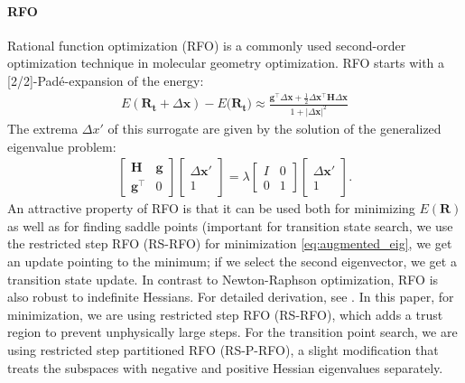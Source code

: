 \documentclass[pdflatex,sn-mathphys-num]{sn-jnl}%
\theoremstyle{thmstyleone}%
\theoremstyle{thmstyletwo}%
\theoremstyle{thmstylethree}%
\begin{document}
\begin{appendices}
\paragraph{RFO \label{sec:rfo_background}}
Rational function optimization (RFO) \citep{simons1983,banerjee1985} is a commonly used second-order optimization technique in molecular geometry optimization. RFO starts with a [2/2]-Pad\'e-expansion of the energy:
\begin{align}
    E(\mathbf{R_t} + \Delta \mathbf{x}) - E(\mathbf{R_t)} \approx \frac{\mathbf{g}^\top \Delta \mathbf{x} + \frac{1}{2} \Delta \mathbf{x}^\top \mathbf{H} \Delta \mathbf{x}}{1 + |\Delta\mathbf{x}|^2 }
\end{align}
The extrema $\Delta x'$ of this surrogate are given by the solution of the generalized eigenvalue problem:
\begin{align}
\begin{bmatrix}
    \mathbf{H} & \mathbf{g} \\
    \mathbf{g}^\top & 0
\end{bmatrix}
\begin{bmatrix}
    \Delta \mathbf{x}' \\
    1
\end{bmatrix}
=
\lambda
\begin{bmatrix}
    I & 0 \\
    0 & 1
\end{bmatrix}
\begin{bmatrix}
    \Delta \mathbf{x}' \\
    1
\end{bmatrix}. \label{eq:augmented_eig}
\end{align}
An attractive property of RFO is that it can be used both for minimizing $E(\mathbf{R})$ as well as for finding saddle points (important for transition state search, we use the restricted step RFO (RS-RFO) for minimization \ref{eq:augmented_eig}, we get an update pointing to the minimum; if we select the second eigenvector, we get a transition state update. In contrast to Newton-Raphson optimization, RFO is also robust to indefinite Hessians. For detailed derivation, see \citep{simons1983, banerjee1985}. In this paper, for minimization, we are using restricted step RFO (RS-RFO), which adds a trust region to prevent unphysically large steps. For the transition point search, we are using restricted step partitioned RFO (RS-P-RFO), a slight modification that treats the subspaces with negative and positive Hessian eigenvalues separately.


\end{appendices}
\end{document}
